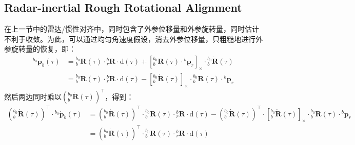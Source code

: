 \documentclass[12pt, onecolumn]{article}
\newcommand\liehat[1]{\left[ #1 \right]_\times}
\newcommand\bsm[1]{\boldsymbol{\mathrm{#1}}}
\begin{document}
	\subsection{Radar-inertial Rough Rotational Alignment}
	在上一节中的雷达/惯性对齐中，同时包含了外参位移量和外参旋转量，同时估计不利于收敛。为此，可以通过均匀角速度假设，消去外参位移量，只粗糙地进行外参旋转量的恢复，即：
	\begin{equation}
	\begin{aligned}
	{^{b_0}\dot{\boldsymbol{p}}_b(\tau)}&={^{b_0}_{b}\boldsymbol{R}}(\tau)\cdot{^{b}_{r}\boldsymbol{R}}\cdot\bsm{d}(\tau)
		+\liehat{{^{b_0}_{b}\boldsymbol{R}(\tau)}\cdot{^{b}{\boldsymbol{p}}_r}}\cdot{^{b_0}_{b}\dot{\boldsymbol{R}}(\tau)}
		\\
		&={^{b_0}_{b}\boldsymbol{R}}(\tau)\cdot{^{b}_{r}\boldsymbol{R}}\cdot\bsm{d}(\tau)
				-\liehat{{^{b_0}_{b}\dot{\boldsymbol{R}}(\tau)}}\cdot{^{b_0}_{b}\boldsymbol{R}(\tau)}\cdot{^{b}{\boldsymbol{p}}_r}
	\end{aligned}
	\end{equation}
	然后两边同时乘以$\left( {^{b_0}_{b}\dot{\boldsymbol{R}}(\tau)}\right) ^\top$，得到：
	\begin{equation}
	\begin{aligned}
	\left( {^{b_0}_{b}\dot{\boldsymbol{R}}(\tau)}\right) ^\top\cdot{^{b_0}\dot{\boldsymbol{p}}_b(\tau)}
	&=\left( {^{b_0}_{b}\dot{\boldsymbol{R}}(\tau)}\right) ^\top\cdot{^{b_0}_{b}\boldsymbol{R}}(\tau)\cdot{^{b}_{r}\boldsymbol{R}}\cdot\bsm{d}(\tau)-\left( {^{b_0}_{b}\dot{\boldsymbol{R}}(\tau)}\right) ^\top\cdot\liehat{{^{b_0}_{b}\dot{\boldsymbol{R}}(\tau)}}\cdot{^{b_0}_{b}\boldsymbol{R}(\tau)}\cdot{^{b}{\boldsymbol{p}}_r}
	\\
	&=\left( {^{b_0}_{b}\dot{\boldsymbol{R}}(\tau)}\right) ^\top\cdot{^{b_0}_{b}\boldsymbol{R}}(\tau)\cdot{^{b}_{r}\boldsymbol{R}}\cdot\bsm{d}(\tau)	
	\end{aligned}
	\end{equation}
	
\end{document}
